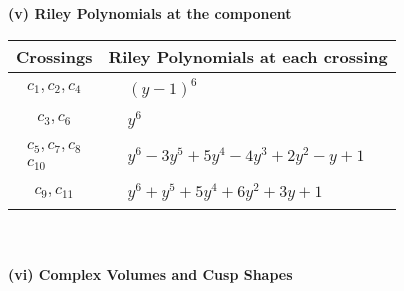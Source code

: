 \documentclass[1p]{elsarticle_modified}
\theoremstyle{definition}
\begin{document}
\newpage\renewcommand{\arraystretch}{1}
\flushleft \textbf{(v) Riley Polynomials at the component}\newline \\
\begin{tabular}{m{50pt}|m{274pt}}
Crossings & \hspace{64pt}Riley Polynomials at each crossing \\
\hline $$\begin{aligned}c_{1},c_{2},c_{4}\end{aligned}$$&$\begin{aligned}
&(y-1)^6
\end{aligned}$\\
\hline $$\begin{aligned}c_{3},c_{6}\end{aligned}$$&$\begin{aligned}
&y^6
\end{aligned}$\\
\hline $$\begin{aligned}c_{5},c_{7},c_{8}\\c_{10}\end{aligned}$$&$\begin{aligned}
&y^6-3 y^5+5 y^4-4 y^3+2 y^2- y+1
\end{aligned}$\\
\hline $$\begin{aligned}c_{9},c_{11}\end{aligned}$$&$\begin{aligned}
&y^6+y^5+5 y^4+6 y^2+3 y+1
\end{aligned}$\\
\hline
\end{tabular}\\~\\
\newpage\flushleft \textbf{(vi) Complex Volumes and Cusp Shapes}
\end{document}
